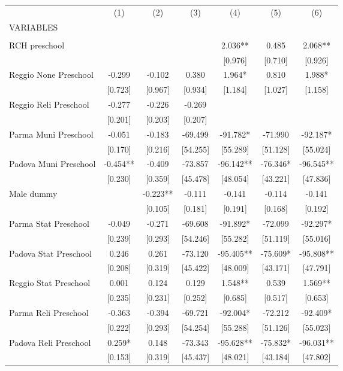 \begin{tabular}{lcccccc} \hline
 & (1) & (2) & (3) & (4) & (5) & (6) \\
VARIABLES &  &  &  &  &  &  \\ \hline
 &  &  &  &  &  &  \\
RCH preschool &  &  &  & 2.036** & 0.485 & 2.068** \\
 &  &  &  & [0.976] & [0.710] & [0.926] \\
Reggio None Preschool & -0.299 & -0.102 & 0.380 & 1.964* & 0.810 & 1.988* \\
 & [0.723] & [0.967] & [0.934] & [1.184] & [1.027] & [1.158] \\
Reggio Reli Preschool & -0.277 & -0.226 & -0.269 &  &  &  \\
 & [0.201] & [0.203] & [0.207] &  &  &  \\
Parma Muni Preschool & -0.051 & -0.183 & -69.499 & -91.782* & -71.990 & -92.187* \\
 & [0.170] & [0.216] & [54.255] & [55.289] & [51.128] & [55.024] \\
Padova Muni Preschool & -0.454** & -0.409 & -73.857 & -96.142** & -76.346* & -96.545** \\
 & [0.230] & [0.359] & [45.478] & [48.054] & [43.221] & [47.836] \\
Male dummy &  & -0.223** & -0.111 & -0.141 & -0.114 & -0.141 \\
 &  & [0.105] & [0.181] & [0.191] & [0.168] & [0.192] \\
Parma Stat Preschool & -0.049 & -0.271 & -69.608 & -91.892* & -72.099 & -92.297* \\
 & [0.239] & [0.293] & [54.246] & [55.282] & [51.119] & [55.016] \\
Padova Stat Preschool & 0.246 & 0.261 & -73.120 & -95.405** & -75.609* & -95.808** \\
 & [0.208] & [0.319] & [45.422] & [48.009] & [43.171] & [47.791] \\
Reggio Stat Preschool & 0.001 & 0.124 & 0.129 & 1.548** & 0.539 & 1.569** \\
 & [0.235] & [0.231] & [0.252] & [0.685] & [0.517] & [0.653] \\
Parma Reli Preschool & -0.363 & -0.394 & -69.721 & -92.004* & -72.212 & -92.409* \\
 & [0.222] & [0.293] & [54.254] & [55.288] & [51.126] & [55.023] \\
Padova Reli Preschool & 0.259* & 0.148 & -73.343 & -95.628** & -75.832* & -96.031** \\
 & [0.153] & [0.319] & [45.437] & [48.021] & [43.184] & [47.802] \\

\end{tabular}
